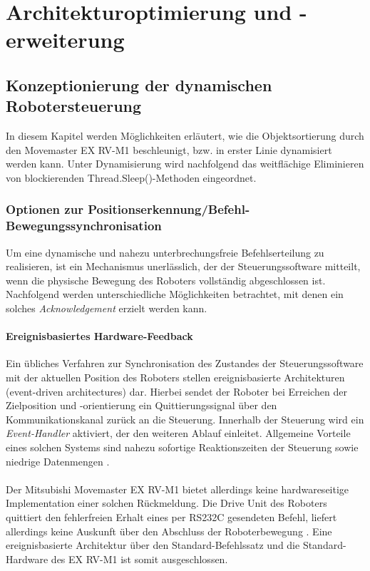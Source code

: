 \chapter{Architekturoptimierung und -erweiterung}
\label{kap:Architekturoptimierung und -erweiterung}
\section{Konzeptionierung der dynamischen Robotersteuerung}
\label{kap:Konzeptionierung der dynamischen Robotersteuerung}
In diesem Kapitel werden Möglichkeiten erläutert, wie die Objektsortierung durch den Movemaster EX RV-M1 beschleunigt, bzw. in erster Linie dynamisiert werden kann. Unter Dynamisierung wird nachfolgend das weitflächige Eliminieren von blockierenden Thread.Sleep()-Methoden eingeordnet.
\subsection{Optionen zur Positionserkennung/Befehl-Bewegungssynchronisation}
Um eine dynamische und nahezu unterbrechungsfreie Befehlserteilung zu realisieren, ist ein Mechanismus unerlässlich, der der Steuerungssoftware mitteilt, wenn die physische Bewegung des Roboters vollständig abgeschlossen ist. Nachfolgend werden unterschiedliche Möglichkeiten betrachtet, mit denen ein solches \textit{Acknowledgement} erzielt werden kann.

\subsubsection*{Ereignisbasiertes Hardware-Feedback}
Ein übliches Verfahren zur Synchronisation des Zustandes der Steuerungssoftware mit der aktuellen Position des Roboters stellen ereignisbasierte Architekturen (event-driven architectures) dar. Hierbei sendet der Roboter bei Erreichen der Zielposition und -orientierung ein Quittierungssignal über den Kommunikationskanal zurück an die Steuerung. Innerhalb der Steuerung wird ein \textit{Event-Handler} aktiviert, der den weiteren Ablauf einleitet. Allgemeine Vorteile eines solchen Systems sind nahezu sofortige Reaktionszeiten der Steuerung sowie niedrige Datenmengen \cite{roboticsmeta2024}.\\
\\ Der Mitsubishi Movemaster EX RV-M1 bietet allerdings keine hardwareseitige Implementation einer solchen Rückmeldung. Die Drive Unit des Roboters quittiert den fehlerfreien Erhalt eines per RS232C gesendeten Befehl, liefert allerdings keine Auskunft über den Abschluss der Roboterbewegung \cite[Vgl.]{rvm1manual}. Eine ereignisbasierte Architektur über den Standard-Befehlssatz und die Standard-Hardware des EX RV-M1 ist somit ausgeschlossen.
